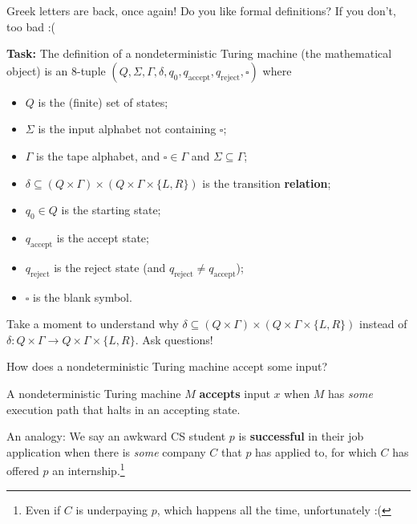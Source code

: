 \documentclass{beamer}
\begin{document}
\begin{frame}{Greek letters are back, once again!}
Do you like formal definitions? If you don't, too bad :(

\textbf{Task:} The definition of a nondeterministic Turing machine (the mathematical object) is an $8$-tuple $(Q, \Sigma, \Gamma, \delta, q_0, q_\text{accept}, q_\text{reject}, \square)$ where
\begin{itemize}
\item $Q$ is the (finite) set of states;
\item $\Sigma$ is the input alphabet not containing $\square$;
\item $\Gamma$ is the tape alphabet, and $\square \in \Gamma$ and $\Sigma \subseteq \Gamma$;
\item {\color{red}$\delta \subseteq (Q \times \Gamma) \times (Q \times \Gamma \times \{L, R\})$ is the transition \textbf{relation};}
\item $q_0 \in Q$ is the starting state;
\item $q_\text{accept}$ is the accept state;
\item $q_\text{reject}$ is the reject state (and $q_\text{reject} \neq q_\text{accept}$);
\item $\square$ is the blank symbol.
\end{itemize}
Take a moment to understand why $\delta \subseteq (Q \times \Gamma) \times (Q \times \Gamma \times \{L, R\})$ instead of $\delta: Q \times \Gamma \to Q \times \Gamma \times \{L, R\}$. Ask questions!
\end{frame}

\begin{frame}{How does a nondeterministic Turing machine accept some input?}

A nondeterministic Turing machine $M$ \textbf{accepts} input $x$ when $M$ has \textit{some} execution path that halts in an accepting state. 

\vspace{2mm}

An analogy: We say an awkward CS student $p$ is \textbf{successful} in their job application when there is \textit{some} company $C$ that $p$ has applied to, for which $C$ has offered $p$ an internship.\footnote{Even if $C$ is underpaying $p$, which happens all the time, unfortunately :(}
\end{frame}
\end{document}
